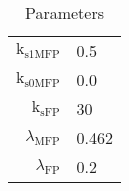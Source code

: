 \documentclass[11pt]{article}
\begin{document}
\begin{table}
\begin{tabular}{r|l}
            $ 
            \text{k}_{\text{s1MFP}} 
            $
               &
            $ 
            $0.5$ 
            $
        \\
            $ 
            \text{k}_{\text{s0MFP}} 
            $
               &
            $ 
            $0.0$ 
            $
        \\
            $ 
            \text{k}_{\text{sFP}} 
            $
               &
            $ 
            $30$ 
            $
        \\
            $ 
            \lambda_{\text{MFP}} 
            $
               &
            $ 
            $0.462$ 
            $
        \\
            $ 
            \lambda_{\text{FP}} 
            $
               &
            $ 
            $0.2$ 
            $
        \\
    \hline
    \end{tabular}
    \caption{Parameters}
    \label{tab:rates}
\end{table}
\end{document}
